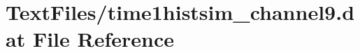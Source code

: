 \hypertarget{TextFiles_2time1histsim__channel9_8dat}{}\section{Text\+Files/time1histsim\+\_\+channel9.dat File Reference}
\label{TextFiles_2time1histsim__channel9_8dat}
